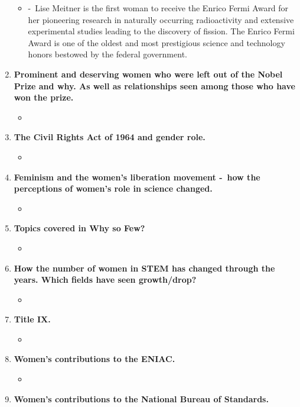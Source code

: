 \documentclass[12pt,a4paper]{article}
\begin{document}
\begin{enumerate}
\begin{itemize}
    \item[]  -\ Lise Meitner is the first woman to receive the Enrico Fermi Award for her pioneering research in naturally occurring radioactivity and extensive experimental studies leading to the discovery of fission. The Enrico Fermi Award is one of the oldest and most prestigious science and technology honors bestowed by the federal government. 
  \end{itemize}
  \item \textbf{Prominent and deserving women who were left out of the Nobel Prize and why. As well as relationships seen among those who have won the prize.}
  \begin{itemize}
    \item[]
  \end{itemize}
  \item \textbf{The Civil Rights Act of 1964 and gender role.}
  \begin{itemize}
    \item[] 
  \end{itemize}
  \item \textbf{Feminism and the women’s liberation movement -\ how the perceptions of women's role in science changed.}
  \begin{itemize}
    \item[] 
  \end{itemize}
  \item \textbf{Topics covered in Why so Few?}
  \begin{itemize}
    \item[] 
  \end{itemize}
  \item \textbf{How the number of women in STEM has changed through the years. Which fields have seen growth/drop?}
  \begin{itemize}
    \item[] 
  \end{itemize}
  \item \textbf{Title IX.}
  \begin{itemize}
    \item[] 
  \end{itemize}
  \item \textbf{Women's contributions to the ENIAC.}
  \begin{itemize}
    \item[] 
  \end{itemize}
  \item \textbf{Women's contributions to the National Bureau of Standards.}

\end{enumerate}
\end{document}
